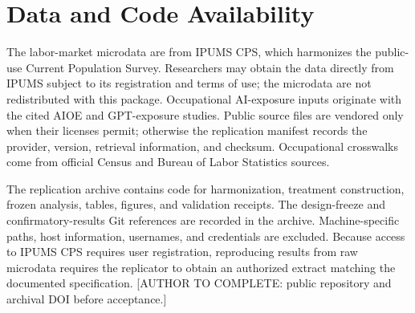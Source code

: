 \section*{Data and Code Availability}

The labor-market microdata are from IPUMS CPS, which harmonizes the public-use Current Population Survey. Researchers may obtain the data directly from IPUMS subject to its registration and terms of use; the microdata are not redistributed with this package. Occupational AI-exposure inputs originate with the cited AIOE and GPT-exposure studies. Public source files are vendored only when their licenses permit; otherwise the replication manifest records the provider, version, retrieval information, and checksum. Occupational crosswalks come from official Census and Bureau of Labor Statistics sources.

The replication archive contains code for harmonization, treatment construction, frozen analysis, tables, figures, and validation receipts. The design-freeze and confirmatory-results Git references are recorded in the archive. Machine-specific paths, host information, usernames, and credentials are excluded. Because access to IPUMS CPS requires user registration, reproducing results from raw microdata requires the replicator to obtain an authorized extract matching the documented specification. [AUTHOR TO COMPLETE: public repository and archival DOI before acceptance.]
